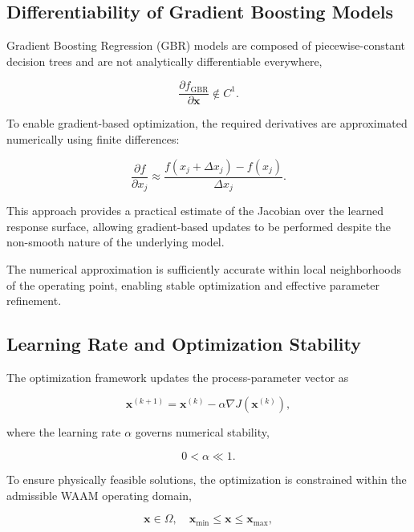 \documentclass[11pt]{article}
\begin{document}
\subsection{Differentiability of Gradient Boosting Models}

Gradient Boosting Regression (GBR) models are composed of piecewise-constant decision trees and are not analytically differentiable everywhere,

\begin{equation}
\frac{\partial f_{\mathrm{GBR}}}{\partial \mathbf{x}} \notin C^1.
\end{equation}

To enable gradient-based optimization, the required derivatives are approximated numerically using finite differences:

\begin{equation}
\frac{\partial f}{\partial x_j}
\approx
\frac{
f(x_j + \Delta x_j) - f(x_j)
}{
\Delta x_j
}.
\end{equation}

This approach provides a practical estimate of the Jacobian over the learned response surface, allowing gradient-based updates to be performed despite the non-smooth nature of the underlying model.

The numerical approximation is sufficiently accurate within local neighborhoods of the operating point, enabling stable optimization and effective parameter refinement.

\subsection{Learning Rate and Optimization Stability}

The optimization framework updates the process-parameter vector as

\begin{equation}
\mathbf{x}^{(k+1)} =
\mathbf{x}^{(k)} - \alpha \nabla J(\mathbf{x}^{(k)}),
\end{equation}

where the learning rate $\alpha$ governs numerical stability,

\begin{equation}
0 < \alpha \ll 1.
\end{equation}

To ensure physically feasible solutions, the optimization is constrained within the admissible WAAM operating domain,

\begin{equation}
\mathbf{x} \in \Omega,
\quad
\mathbf{x}_{\min} \leq \mathbf{x} \leq \mathbf{x}_{\max},
\end{equation}
\end{document}
